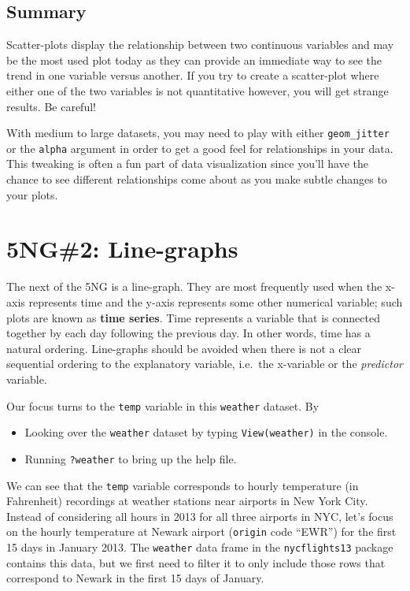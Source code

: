 \documentclass[]{tufte-book}
\providecommand{\tightlist}{%
  \setlength{\itemsep}{0pt}\setlength{\parskip}{0pt}}
\begin{document}
\subsection{Summary}\label{summary}

Scatter-plots display the relationship between two continuous variables
and may be the most used plot today as they can provide an immediate way
to see the trend in one variable versus another. If you try to create a
scatter-plot where either one of the two variables is not quantitative
however, you will get strange results. Be careful!

With medium to large datasets, you may need to play with either
\texttt{geom\_jitter} or the \texttt{alpha} argument in order to get a
good feel for relationships in your data. This tweaking is often a fun
part of data visualization since you'll have the chance to see different
relationships come about as you make subtle changes to your plots.

\section{5NG\#2: Line-graphs}\label{linegraphs}

The next of the 5NG is a line-graph. They are most frequently used when
the x-axis represents time and the y-axis represents some other
numerical variable; such plots are known as \textbf{time series}. Time
represents a variable that is connected together by each day following
the previous day. In other words, time has a natural ordering.
Line-graphs should be avoided when there is not a clear sequential
ordering to the explanatory variable, i.e.~the x-variable or the
\emph{predictor} variable.

Our focus turns to the \texttt{temp} variable in this \texttt{weather}
dataset. By

\begin{itemize}
\tightlist
\item
  Looking over the \texttt{weather} dataset by typing
  \texttt{View(weather)} in the console.
\item
  Running \texttt{?weather} to bring up the help file.
\end{itemize}

We can see that the \texttt{temp} variable corresponds to hourly
temperature (in Fahrenheit) recordings at weather stations near airports
in New York City. Instead of considering all hours in 2013 for all three
airports in NYC, let's focus on the hourly temperature at Newark airport
(\texttt{origin} code ``EWR'') for the first 15 days in January 2013.
The \texttt{weather} data frame in the \texttt{nycflights13} package
contains this data, but we first need to filter it to only include those
rows that correspond to Newark in the first 15 days of January.
\end{document}
